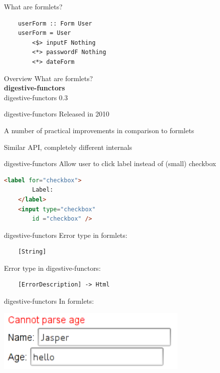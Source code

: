 \documentclass[20pt]{beamer}
\newcommand{\vspaced}{
    \vspace{5mm}
}
\begin{document}
\begin{frame}[fragile]{What are formlets?}
    \begin{lstlisting}
    userForm :: Form User
    userForm = User
        <$> inputF Nothing
        <*> passwordF Nothing
        <*> dateForm
    \end{lstlisting}
\end{frame}


\begin{frame}{Overview}
    What are formlets? \\
    \textbf{digestive-functors} \\
    digestive-functors 0.3 \\
\end{frame}

\begin{frame}{digestive-functors}
    Released in 2010 \\
    \vspaced
    A number of practical improvements in comparison to formlets \\
    \vspaced
    Similar API, completely different internals
\end{frame}

\begin{frame}[fragile]{digestive-functors}
    Allow user to click label instead of (small) checkbox \\
    \begin{lstlisting}[language=html]
    <label for="checkbox">
        Label:
    </label>
    <input type="checkbox"
        id ="checkbox" />
    \end{lstlisting}
\end{frame}

\begin{frame}[fragile]{digestive-functors}
    Error type in formlets:
    \begin{lstlisting}
    [String]
    \end{lstlisting}
    \vspaced
    Error type in digestive-functors:
    \begin{lstlisting}
    [ErrorDescription] -> Html
    \end{lstlisting}
\end{frame}

\begin{frame}{digestive-functors}
    In formlets:
    \vspaced
    \begin{center}
    \includegraphics[width=0.7\textwidth]{images/errors-formlets.png}
    \end{center}
\end{frame}
\end{document}
